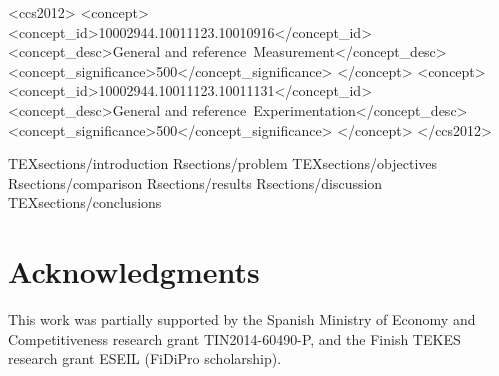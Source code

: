 \documentclass[acmsmall]{acmart}
\begin{document}
\begin{CCSXML}
<ccs2012>
<concept>
<concept_id>10002944.10011123.10010916</concept_id>
<concept_desc>General and reference~Measurement</concept_desc>
<concept_significance>500</concept_significance>
</concept>
<concept>
<concept_id>10002944.10011123.10011131</concept_id>
<concept_desc>General and reference~Experimentation</concept_desc>
<concept_significance>500</concept_significance>
</concept>
</ccs2012>
\end{CCSXML}



%
\maketitle

 {TEXsections/introduction}
 {Rsections/problem}
 {TEXsections/objectives}
 {Rsections/comparison}
 {Rsections/results}
 {Rsections/discussion}
 {TEXsections/conclusions}

\section{Acknowledgments}

This work was partially supported by the Spanish Ministry of Economy and Competitiveness research grant TIN2014-60490-P, and the Finish TEKES research grant ESEIL (FiDiPro scholarship).

\balance




\end{document}

